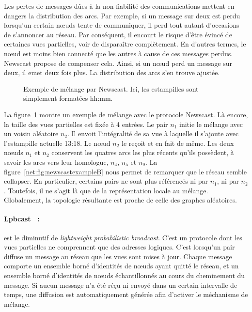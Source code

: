 \noindent Les pertes de messages dûes à la non-fiabilité des communications
mettent en dangers la distribution des arcs. Par exemple, si un message sur deux
est perdu lorsqu'un certain nœuds tente de communiquer, il perd tout autant
d'occasions de s'annoncer au réseau. Par conséquent, il encourt le risque d'être
évincé de certaines vues partielles, voir de disparaître complètement. En
d'autres termes, le nœud est moins bien connecté que les autres à cause de ces
messages perdus. Newscast propose de compenser cela. Ainsi, si un nœud perd un
message sur deux, il emet deux fois plus. La distribution des arcs s'en trouve
ajustée.

\begin{figure}
  \centering
  \hspace{35pt}
  \caption[Exemple de mélange par Newscast]
  {\label{net:fig:newscastexample} Exemple de mélange par Newscast. Ici, les
    estampilles sont simplement formatées hh:mm.}
\end{figure}

\noindent La figure~\ref{net:fig:newscastexample} montre un exemple de mélange
avec le protocole Newscast. Là encore, la taille des vues partielles est fixée à
4 entrées. Le pair $n_1$ initie le mélange avec un voisin aléatoire $n_2$. Il
envoit l'intégralité de sa vue à laquelle il s'ajoute avec l'estampille actuelle
13:18. Le nœud $n_2$ le reçoit et en fait de même. Les deux nœuds $n_1$ et $n_2$
conservent les quatres arcs les plus récents qu'ils possèdent, à savoir les arcs
vers leur homologue, $n_4$, $n_5$ et $n_9$. La
figure~\ref{net:fig:newscastexampleB} nous permet de remarquer que le réseau
semble collapser. En particulier, certains pairs ne sont plus référencés ni par
$n_1$, ni par $n_2$. Toutefois, il ne s'agit là que de la représentation locale
au mélange. Globalement, la topologie résultante est proche de celle des graphes
aléatoires.

\paragraph{Lpbcast~\cite{eugster2003lightweight} :} est le diminutif de
\emph{lightweight probabilistic broadcast}. C'est un protocole dont les vues
partielles ne comprennent que des adresses logiques. C'est lorsqu'un pair
diffuse un message au réseau que les vues sont mises à jour. Chaque message
comporte un ensemble borné d'identités de nœuds ayant quitté le réseau, et un
ensemble borné d'identités de nœuds échantillonnés au cours du cheminement du
message. Si aucun message n'a été réçu ni envoyé dans un certain intervalle de
temps, une diffusion est automatiquement générée afin d'activer le méchanisme de
mélange.

